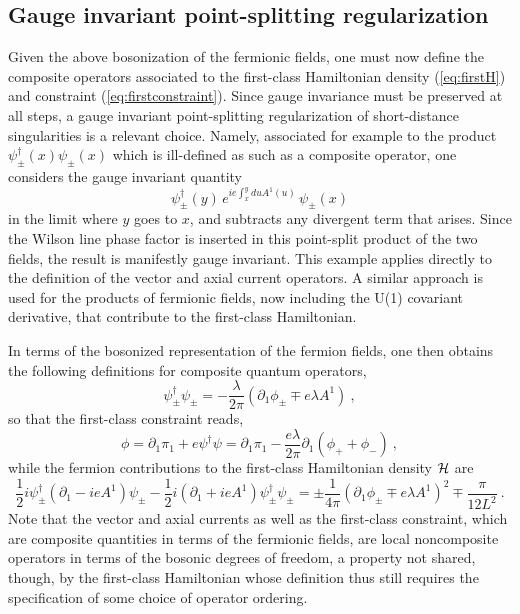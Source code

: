 \documentclass[a4paper,11pt]{article}
\begin{document}
\subsection{Gauge invariant point-splitting regularization}

Given the above bosonization of the fermionic fields, one must now
define the composite operators associated to the first-class Hamiltonian
density (\ref{eq:firstH}) and constraint (\ref{eq:firstconstraint}).
Since gauge invariance must be preserved at all steps, a gauge invariant
point-splitting regularization of short-distance singularities is a
relevant choice. Namely, associated for example to the product 
$\psi^\dagger_\pm(x)\psi_\pm(x)$ which is ill-defined as such as a composite
operator, one considers the gauge invariant quantity
\begin{equation}
\psi^\dagger_\pm(y)\,e^{ie\int_x^y du A^1(u)}\,\psi_\pm(x)
\end{equation}
in the limit where $y$ goes to $x$, and subtracts any divergent term
that arises. Since the Wilson line phase factor is inserted in this
point-split product of the two fields, the result is manifestly gauge invariant.
This example applies directly to the definition of the vector and axial
current operators. A similar approach is used for the products of fermionic
fields, now including the U(1) covariant derivative, that contribute to the
first-class Hamiltonian.

In terms of the bosonized representation of the fermion fields, one then 
obtains the following definitions for composite quantum operators,
\begin{equation}
\psi^\dagger_\pm\psi_\pm=-\frac{\lambda}{2\pi}
\left(\partial_1\phi_\pm\mp e\lambda A^1\right)\ ,
\end{equation}
so that the first-class constraint reads,
\begin{equation}
\phi=\partial_1\pi_1+e\psi^\dagger\psi=\partial_1\pi_1-\frac{e\lambda}{2\pi}
\partial_1(\phi_++\phi_-)\ ,
\label{eq:firstphi}
\end{equation}
while the fermion contributions to the first-class Hamiltonian density 
${\cal H}$ are
\begin{equation}
\frac{1}{2}i\psi^\dagger_\pm\left(\partial_1-ieA^1\right)\psi_\pm-
\frac{1}{2}i\left(\partial_1+ieA^1\right)\psi^\dagger_\pm\psi_\pm=
\pm\frac{1}{4\pi}\left(\partial_1\phi_\pm\mp e\lambda A^1\right)^2
\mp\frac{\pi}{12L^2}\ .
\end{equation}
Note that the vector and axial currents as well as the first-class constraint,
which are composite quantities in terms of the fermionic fields, are
local noncomposite ope\-ra\-tors in terms of the bosonic degrees of freedom, 
a property not shared, though, by the first-class Hamiltonian whose definition 
thus still requires the specification of some choice of operator ordering.
\end{document}
